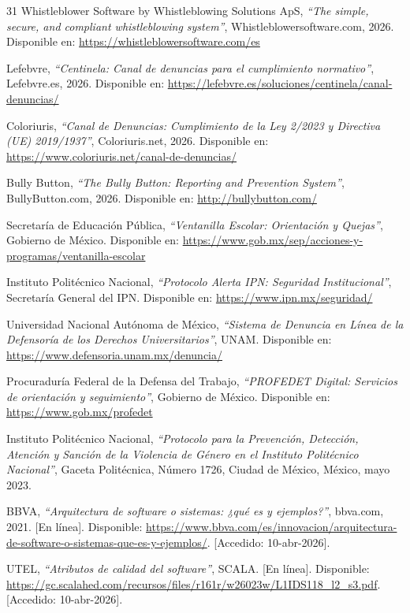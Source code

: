 \begin{thebibliography}{31}
Whistleblower Software by Whistleblowing Solutions ApS, \textit{``The simple, secure, and compliant whistleblowing system''}, Whistleblowersoftware.com, 2026. Disponible en: \url{https://whistleblowersoftware.com/es}

Lefebvre, \textit{``Centinela: Canal de denuncias para el cumplimiento normativo''}, Lefebvre.es, 2026. Disponible en: \url{https://lefebvre.es/soluciones/centinela/canal-denuncias/}

Coloriuris, \textit{``Canal de Denuncias: Cumplimiento de la Ley 2/2023 y Directiva (UE) 2019/1937''}, Coloriuris.net, 2026. Disponible en: \url{https://www.coloriuris.net/canal-de-denuncias/}

Bully Button, \textit{``The Bully Button: Reporting and Prevention System''}, BullyButton.com, 2026. Disponible en: \url{http://bullybutton.com/}

Secretaría de Educación Pública, \textit{``Ventanilla Escolar: Orientación y Quejas''}, Gobierno de México. Disponible en: \url{https://www.gob.mx/sep/acciones-y-programas/ventanilla-escolar}

Instituto Politécnico Nacional, \textit{``Protocolo Alerta IPN: Seguridad Institucional''}, Secretaría General del IPN. Disponible en: \url{https://www.ipn.mx/seguridad/}

Universidad Nacional Autónoma de México, \textit{``Sistema de Denuncia en Línea de la Defensoría de los Derechos Universitarios''}, UNAM. Disponible en: \url{https://www.defensoria.unam.mx/denuncia/}

Procuraduría Federal de la Defensa del Trabajo, \textit{``PROFEDET Digital: Servicios de orientación y seguimiento''}, Gobierno de México. Disponible en: \url{https://www.gob.mx/profedet}

Instituto Politécnico Nacional, \textit{``Protocolo para la Prevención, Detección, Atención y Sanción de la Violencia de Género en el Instituto Politécnico Nacional''}, Gaceta Politécnica, Número 1726, Ciudad de México, México, mayo 2023.

BBVA, \textit{``Arquitectura de software o sistemas: ¿qué es y ejemplos?''}, bbva.com, 2021. [En línea]. Disponible: \url{https://www.bbva.com/es/innovacion/arquitectura-de-software-o-sistemas-que-es-y-ejemplos/}. [Accedido: 10-abr-2026].

UTEL, \textit{``Atributos de calidad del software''}, SCALA. [En línea]. Disponible: \url{https://gc.scalahed.com/recursos/files/r161r/w26023w/L1IDS118_l2_s3.pdf}. [Accedido: 10-abr-2026].


\end{thebibliography}
